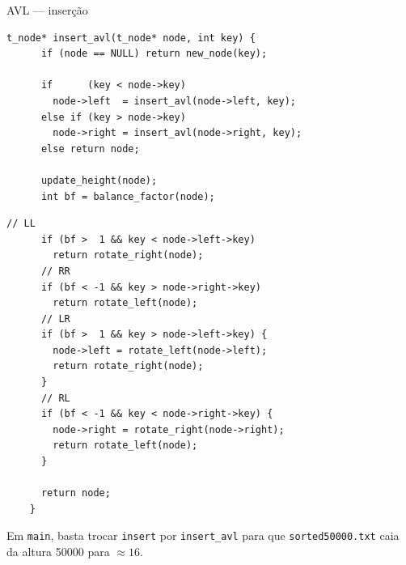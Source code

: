 \documentclass{beamer}
\begin{document}
\begin{frame}{AVL --- inserção}
  \framebreak

  \begin{lstlisting}[style=normalc,caption=tree.c]
    t_node* insert_avl(t_node* node, int key) {
      if (node == NULL) return new_node(key);

      if      (key < node->key)
        node->left  = insert_avl(node->left, key);
      else if (key > node->key)
        node->right = insert_avl(node->right, key);
      else return node;

      update_height(node);
      int bf = balance_factor(node);
  \end{lstlisting}

  \framebreak

  \begin{lstlisting}[style=normalc,caption=tree.c]
      // LL
      if (bf >  1 && key < node->left->key)
        return rotate_right(node);
      // RR
      if (bf < -1 && key > node->right->key)
        return rotate_left(node);
      // LR
      if (bf >  1 && key > node->left->key) {
        node->left = rotate_left(node->left);
        return rotate_right(node);
      }
      // RL
      if (bf < -1 && key < node->right->key) {
        node->right = rotate_right(node->right);
        return rotate_left(node);
      }

      return node;
    }
  \end{lstlisting}

  Em \texttt{main}, basta trocar \texttt{insert} por \texttt{insert\_avl}
  para que \texttt{sorted50000.txt} caia da altura 50000 para
  $\approx 16$.

\end{frame}
\end{document}
